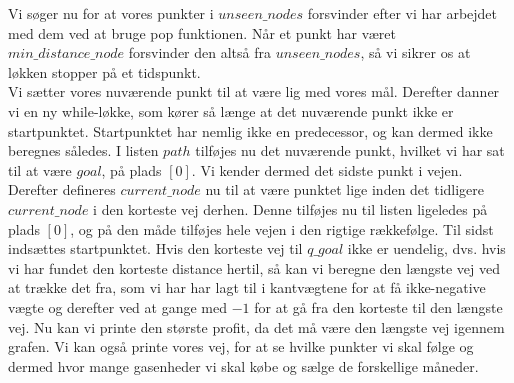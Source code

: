 Vi søger nu for at vores punkter i $unseen\_nodes$ forsvinder efter vi har arbejdet med dem ved at bruge pop funktionen. Når et punkt har været $min\_distance\_node$ forsvinder den altså fra $unseen\_nodes$, så vi sikrer os at løkken stopper på et tidspunkt. \\
Vi sætter vores nuværende punkt til at være lig med vores mål.
Derefter danner vi en ny while-løkke, som kører så længe at det nuværende punkt ikke er startpunktet. Startpunktet har nemlig ikke en predecessor, og kan dermed ikke beregnes således. I listen $path$ tilføjes nu det nuværende punkt, hvilket vi har sat til at være $goal$, på plads $[0]$. Vi kender dermed det sidste punkt i vejen. Derefter defineres $current\_node$ nu til at være punktet lige inden det tidligere $current\_node$ i den korteste vej derhen. Denne tilføjes nu til listen ligeledes på plads $[0]$, og på den måde tilføjes hele vejen i den rigtige rækkefølge. Til sidst indsættes startpunktet.
Hvis den korteste vej til $q\_goal$ ikke er uendelig, dvs. hvis vi har fundet den korteste distance hertil, så kan vi beregne den længste vej ved at trække det fra, som vi har har lagt til i kantvægtene for at få ikke-negative vægte og derefter ved at gange med $-1$ for at gå fra den korteste til den længste vej. 
Nu kan vi printe den største profit, da det må være den længste vej igennem grafen. Vi kan også printe vores vej, for at se hvilke punkter vi skal følge og dermed hvor mange gasenheder vi skal købe og sælge de forskellige måneder.

